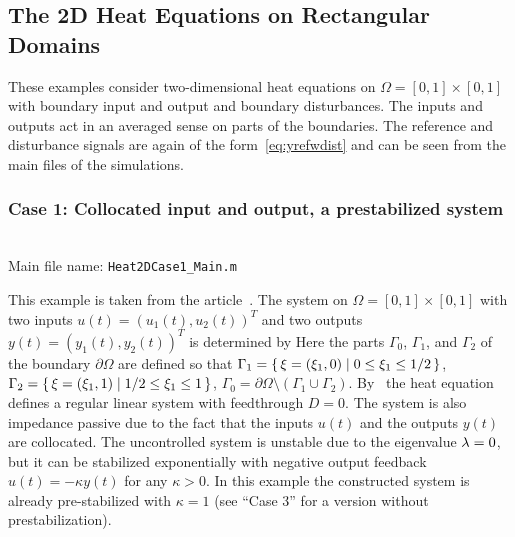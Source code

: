 \documentclass[11pt, a4paper]{amsart}
\theoremstyle{definition}
\numberwithin{equation}{section}
\begin{document}
\subsection{The 2D Heat Equations on Rectangular Domains}

These examples consider two-dimensional heat equations on $\Omega = [0,1]\times [0,1]$ with boundary input and output and boundary disturbances. The inputs and outputs act in an averaged sense on parts of the boundaries.
The reference and disturbance signals are again of the form~\eqref{eq:yrefwdist} and can be seen from the main files of the simulations.

\medskip

\subsubsection*{Case 1: Collocated input and output, a prestabilized system}
~\\[-1ex]


  \noindent Main file name: \texttt{Heat2DCase1\_Main.m}

\medskip

This example is taken from the article~.
The system on $\Omega = [0,1]\times [0,1]$ with two inputs $u(t)=(u_1(t),u_2(t))^T$ and two outputs $y(t)=(y_1(t),y_2(t))^T$ is determined by
  Here the parts $\Gamma_0$, $\Gamma_1$, and $\Gamma_2$ of the boundary $\partial \Omega$ are defined so that
  $\Gamma_1 = \{\,\xi=(\xi_1,0)\mid0\leq \xi_1\leq 1/2\,\}$,
  $\Gamma_2 = \{\,\xi=(\xi_1,1)\mid1/2\leq \xi_1\leq 1\,\}$, 
  $\Gamma_0 = \partial \Omega \setminus (\Gamma_1 \cup \Gamma_2)$. By~\cite[Cor. 2]{ByrGil02} the heat equation defines a regular linear system with feedthrough $D=0$. The system is also impedance passive due to the fact that the inputs $u(t)$ and the outputs $y(t) $ are collocated.
The uncontrolled system is unstable due to the eigenvalue $\lambda=0$, but it can be stabilized exponentially with negative output feedback $u(t) = -\kappa y(t)$ for any $\kappa>0$.
In this example the constructed system is already pre-stabilized with $\kappa = 1$ (see ``Case 3'' for a version without prestabilization).
\end{document}
